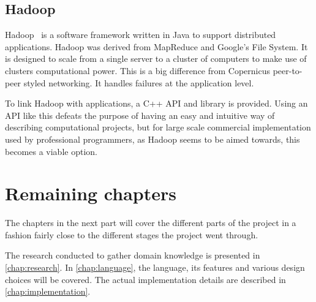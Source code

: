 \subsection{Hadoop}
Hadoop~\cite{hadoop:online} is a software framework written in Java to
support distributed applications. Hadoop was derived from MapReduce
and Google's File System. It is designed to scale from a single server
to a cluster of computers to make use of clusters computational
power. This is a big difference from Copernicus peer-to-peer styled
networking. It handles failures at the application level.

To link Hadoop with applications, a C++ API and library is
provided. Using an API like this defeats the purpose of having an easy
and intuitive way of describing computational projects, but for large
scale commercial implementation used by professional programmers, as
Hadoop seems to be aimed towards, this becomes a viable option.


\section{Remaining chapters}
The chapters in the next part will cover the different parts of the
project in a fashion fairly close to the different stages the project
went through.

The research conducted to gather domain knowledge is presented in
\autoref{chap:research}. In \autoref{chap:language}, the language, its
features and various design choices will be covered. The actual
implementation details are described in \autoref{chap:implementation}.
